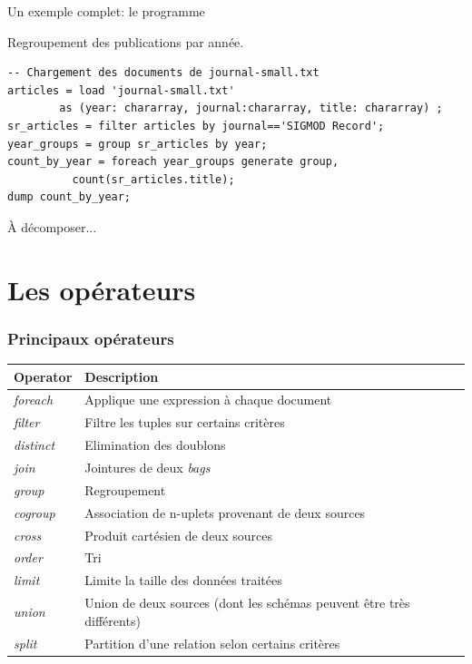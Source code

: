 \begin{frame}[fragile]{Un exemple complet: le programme}

Regroupement des publications par année. 


\vfill

\begin{verbatim}
-- Chargement des documents de journal-small.txt
articles = load 'journal-small.txt' 
        as (year: chararray, journal:chararray, title: chararray) ;
sr_articles = filter articles by journal=='SIGMOD Record';
year_groups = group sr_articles by year;
count_by_year = foreach year_groups generate group, 
          count(sr_articles.title);
dump count_by_year;
\end{verbatim}

\vfill

À décomposer...
\end{frame}

\section{Les opérateurs \pig}

\begin{frame}[fragile]
\frametitle{Principaux opérateurs \pig}

\begin{small}
\begin{tabular}{lp{9cm}}
\hline
\textbf{Operator} & \textbf{Description} \\
\hline
\textit{foreach} & Applique une expression à chaque document\\ 
\textit{filter} &  Filtre les tuples sur certains critères\\ 
\textit{distinct} &  Elimination des doublons\\ 
\textit{join} &  Jointures de deux \textit{bags}\\ 
\textit{group} & Regroupement \\
\textit{cogroup} & Association de n-uplets provenant de deux sources\\ 
\textit{cross} &  Produit cartésien de deux sources\\ 
\textit{order} & Tri\\ 
\textit{limit} & Limite la taille des données traitées\\
\textit{union} &  Union de deux sources (dont les schémas peuvent être très différents)\\ 
\textit{split} & Partition d'une relation selon certains critères\\
\hline
\end{tabular}
\end{small}

\end{frame}

